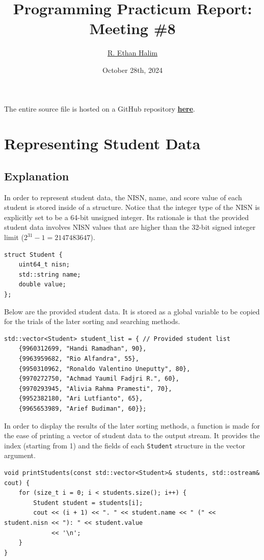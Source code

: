 \documentclass[12pt]{article}
\title{Programming Practicum Report:\\Meeting \#8}
\author{\href{https://github.com/avaxar}{R. Ethan Halim}}
\date{October 28th, 2024}
\begin{document}
\maketitle

The entire source file is hosted on a GitHub repository \href{https://github.com/avaxar/uni-practica-1/tree/main/week_8/01_sort_search}{\textbf{here}}.

\section{Representing Student Data}

\subsection{Explanation}

In order to represent student data, the NISN, name, and score value of each student is stored inside of a structure. Notice that the integer type of the NISN is explicitly set to be a 64-bit unsigned integer. Its rationale is that the provided student data involves NISN values that are higher than the 32-bit signed integer limit ($2^{31} - 1 = 2147483647$).

\begin{verbatim}
struct Student {
    uint64_t nisn;
    std::string name;
    double value;
};
\end{verbatim}

Below are the provided student data. It is stored as a global variable to be copied for the trials of the later sorting and searching methods.

\begin{verbatim}
std::vector<Student> student_list = { // Provided student list
    {9960312699, "Handi Ramadhan", 90},
    {9963959682, "Rio Alfandra", 55},
    {9950310962, "Ronaldo Valentino Uneputty", 80},
    {9970272750, "Achmad Yaumil Fadjri R.", 60},
    {9970293945, "Alivia Rahma Pramesti", 70},
    {9952382180, "Ari Lutfianto", 65},
    {9965653989, "Arief Budiman", 60}};
\end{verbatim}

In order to display the results of the later sorting methods, a function is made for the ease of printing a vector of student data to the output stream. It provides the index (starting from 1) and the fields of each \texttt{Student} structure in the vector argument.

\begin{verbatim}
void printStudents(const std::vector<Student>& students, std::ostream& cout) {
    for (size_t i = 0; i < students.size(); i++) {
        Student student = students[i];
        cout << (i + 1) << ". " << student.name << " (" << student.nisn << "): " << student.value
             << '\n';
    }
}
\end{verbatim}
\end{document}
